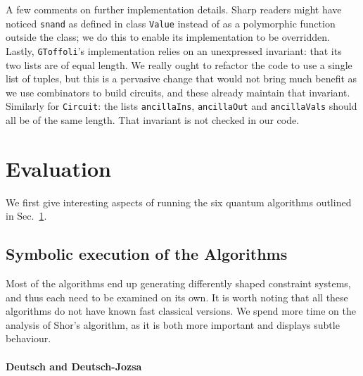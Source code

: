 \documentclass[sigplan,review]{acmart}
\theoremstyle{definition}
\begin{document}
A few comments on further implementation details. Sharp readers might have noticed
\texttt{snand} as defined in class \texttt{Value} instead of as a polymorphic function
outside the class; we do this to enable its implementation to be overridden.
Lastly, \texttt{GToffoli}'s implementation relies on an unexpressed invariant: that its
two lists are of equal length. We really ought to refactor the code to use a single
list of tuples, but this is a pervasive change that would not bring much benefit as
we use combinators to build circuits, and these already maintain that invariant.
Similarly for \texttt{Circuit}: the lists \texttt{ancillaIns}, \texttt{ancillaOut}
and \texttt{ancillaVals} should all be of the same length. That invariant is not
checked in our code.


\section{Evaluation}
\label{sec5}

We first give interesting aspects of running the six quantum algorithms
outlined in Sec.~\ref{sec5}.

\subsection{Symbolic execution of the Algorithms}

Most of the algorithms end up generating differently shaped constraint
systems, and thus each need to be examined on its own. It is worth noting
that all these algorithms do not have known fast classical versions.
We spend more time on the analysis of Shor's algorithm, as it is both
more important and displays subtle behaviour.

\paragraph*{Deutsch and Deutsch-Jozsa}
\end{document}
